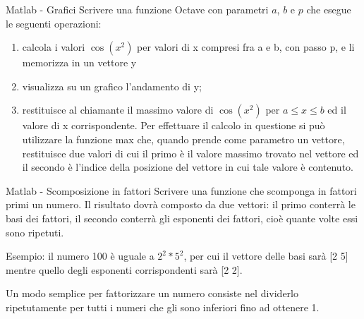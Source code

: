\documentclass[aspectratio=169, ]{beamer}
\begin{document}
\begin{frame}{Matlab - Grafici}
    Scrivere una funzione Octave con parametri $a$, $b$ e $p$ che esegue le seguenti operazioni:
    \begin{enumerate}
        \item  calcola i valori $\cos(x^2)$ per valori di x compresi fra a e b, con passo p, e li memorizza in un vettore y
        \item visualizza su un grafico l'andamento di y;
        \item restituisce al chiamante il massimo valore di $\cos(x^2)$ per $a \leq x \leq b$ ed il valore di x corrispondente. Per effettuare il
            calcolo in questione si può utilizzare la funzione max che, quando prende come parametro un vettore, restituisce due
            valori di cui il primo è il valore massimo trovato nel vettore ed il secondo è l’indice della posizione del vettore in cui tale
            valore è contenuto.
    \end{enumerate}
\end{frame}


\begin{frame}{Matlab - Scomposizione in fattori}
    Scrivere una funzione che scomponga in fattori primi un numero.
    Il risultato dovrà composto da due vettori: il primo conterrà le basi dei fattori, il secondo conterrà gli esponenti dei fattori, cioè quante volte essi sono ripetuti.

    Esempio: il numero 100 è uguale a $2^2 * 5^2$, per cui il vettore delle basi sarà [2 5] mentre quello degli esponenti corrispondenti sarà [2 2].

    Un modo semplice per fattorizzare un numero consiste nel dividerlo ripetutamente per tutti i numeri che gli sono inferiori fino ad ottenere 1.
\end{frame}
\fi
\end{document}
